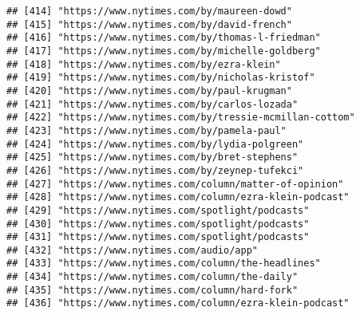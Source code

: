 \documentclass[
]{article}
\begin{document}
\begin{verbatim}
## [414] "https://www.nytimes.com/by/maureen-dowd"                                                                   
## [415] "https://www.nytimes.com/by/david-french"                                                                   
## [416] "https://www.nytimes.com/by/thomas-l-friedman"                                                              
## [417] "https://www.nytimes.com/by/michelle-goldberg"                                                              
## [418] "https://www.nytimes.com/by/ezra-klein"                                                                     
## [419] "https://www.nytimes.com/by/nicholas-kristof"                                                               
## [420] "https://www.nytimes.com/by/paul-krugman"                                                                   
## [421] "https://www.nytimes.com/by/carlos-lozada"                                                                  
## [422] "https://www.nytimes.com/by/tressie-mcmillan-cottom"                                                        
## [423] "https://www.nytimes.com/by/pamela-paul"                                                                    
## [424] "https://www.nytimes.com/by/lydia-polgreen"                                                                 
## [425] "https://www.nytimes.com/by/bret-stephens"                                                                  
## [426] "https://www.nytimes.com/by/zeynep-tufekci"                                                                 
## [427] "https://www.nytimes.com/column/matter-of-opinion"                                                          
## [428] "https://www.nytimes.com/column/ezra-klein-podcast"                                                         
## [429] "https://www.nytimes.com/spotlight/podcasts"                                                                
## [430] "https://www.nytimes.com/spotlight/podcasts"                                                                
## [431] "https://www.nytimes.com/spotlight/podcasts"                                                                
## [432] "https://www.nytimes.com/audio/app"                                                                         
## [433] "https://www.nytimes.com/column/the-headlines"                                                              
## [434] "https://www.nytimes.com/column/the-daily"                                                                  
## [435] "https://www.nytimes.com/column/hard-fork"                                                                  
## [436] "https://www.nytimes.com/column/ezra-klein-podcast"                                                         

\end{verbatim}
\end{document}
